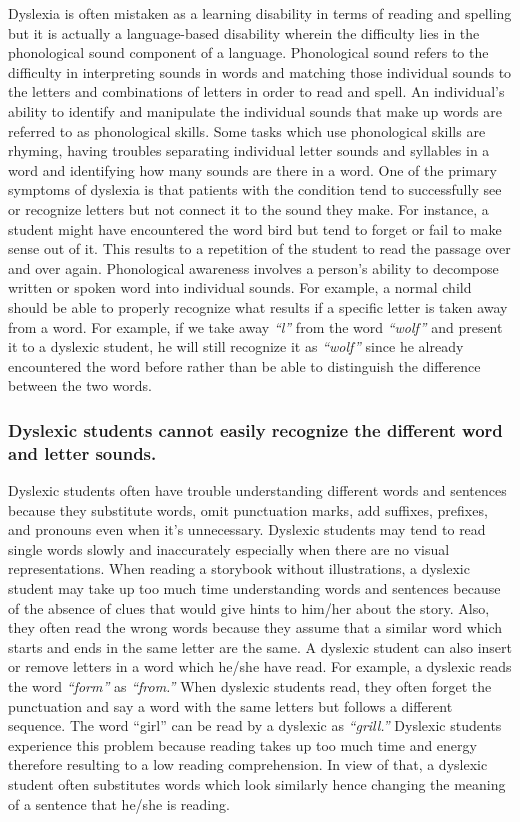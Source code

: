 \documentclass[letterpaper, 12pt, oneside]{book}
\begin{document}
	Dyslexia is often mistaken as a learning disability in terms of reading and spelling but it is actually a language-based disability wherein the difficulty lies in the phonological sound component of a language. Phonological sound refers to the difficulty in interpreting sounds in words and matching those individual sounds to the letters and combinations of letters in order to read and spell. An individual’s ability to identify and manipulate the individual sounds that  make up words are referred to as phonological skills. Some tasks which use phonological skills are rhyming, having troubles separating individual letter sounds and syllables in a word and identifying how many sounds are there in a word. One of the primary symptoms of dyslexia is that patients with the condition tend to  successfully see or recognize letters but not connect it to the sound they make. For instance, a student might have encountered the word bird but tend to forget or fail to make sense out of it. This results to a repetition of the student to read the passage over and over again. Phonological awareness involves a person’s ability to decompose written or spoken word into individual sounds. For example, a normal child should be able to properly recognize what results if a specific letter is taken away from a word. For example, if we take away \textit{“l”} from the word \textit{“wolf”} and present it to a dyslexic student, he will still recognize it as \textit{“wolf”} since he already encountered the word before rather than be able to distinguish the difference between the two words.

\subsubsection{Dyslexic students cannot easily recognize the different word and letter sounds.}
	
    Dyslexic students often have trouble understanding different words and sentences because they substitute words, omit punctuation marks, add suffixes, prefixes, and pronouns even when it’s unnecessary. Dyslexic students may tend to read single words slowly and inaccurately especially when there are no visual representations. When reading a storybook without illustrations, a dyslexic student may take up too much time understanding words and sentences because of the absence of clues that would give hints to him/her about the story. Also, they often read the wrong words because they assume that a similar word which starts and ends in the same letter are the same. A dyslexic student can also insert or remove letters in a word which he/she have read. For example, a dyslexic reads the word \textit{“form”} as \textit{“from.”} When dyslexic students read, they often forget the punctuation and say a word with the same letters but follows a different sequence. The word “girl” can be read by a dyslexic as \textit{“grill.”} Dyslexic students experience this problem because reading takes up too much time and energy therefore resulting to a low reading comprehension. In view of that, a dyslexic student often substitutes words which look similarly hence changing the meaning of a sentence that he/she is reading. 
    
\end{document}
